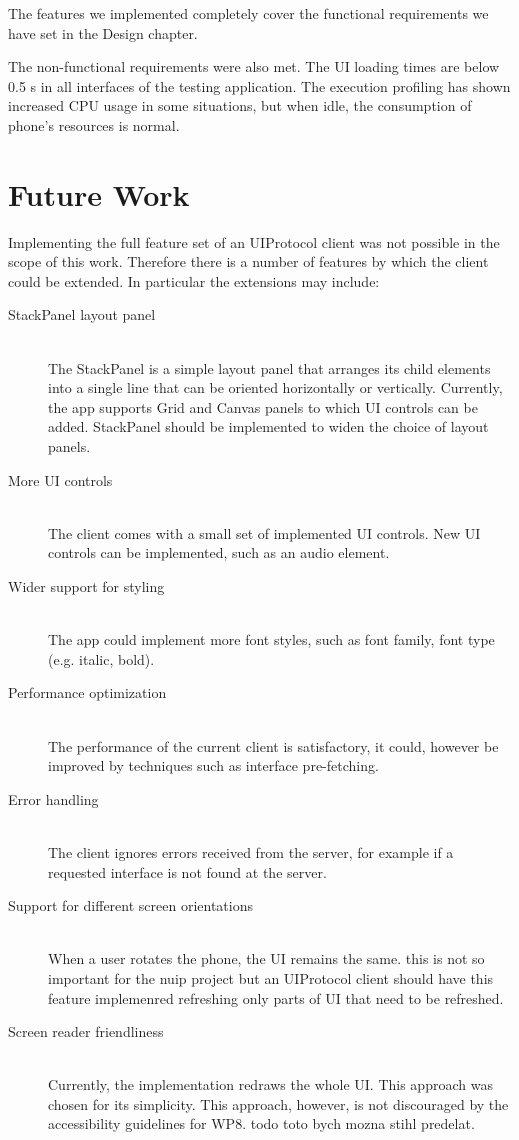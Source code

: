 The features we implemented completely cover the functional requirements we have set in the Design chapter.

The non-functional requirements were also met. The UI loading times are below 0.5 s in all interfaces of the testing application. The execution profiling has shown increased CPU usage in some situations, but when idle, the consumption of phone's resources is normal.

\section{Future Work}
Implementing the full feature set of an UIProtocol client was not possible in the scope of this work. Therefore there is a number of features by which the client could be extended. In particular the extensions may include:

\begin{description}
  \item[StackPanel layout panel] \hfill \\
  The StackPanel is a simple layout panel that arranges its child elements into a single line that can be oriented horizontally or vertically. Currently, the app supports Grid and Canvas panels to which UI controls can be added. StackPanel should be implemented to widen the choice of layout panels. 
  \item[More UI controls] \hfill \\
  The client comes with a small set of implemented UI controls. New UI controls can be implemented, such as an audio element.
  \item[Wider support for styling] \hfill \\
  The app could implement more font styles, such as font family, font type (e.g. italic, bold).
  \item[Performance optimization] \hfill \\
  The performance of the current client is satisfactory, it could, however be improved by techniques such as interface pre-fetching.
  \item[Error handling] \hfill \\
  The client ignores errors received from the server, for example if a requested interface is not found at the server.
  \item[Support for different screen orientations] \hfill \\
When a user rotates the phone, the UI remains the same. this is not so important for the nuip project but an UIProtocol client should have this feature implemenred
refreshing only parts of UI that need to be refreshed.
\item[Screen reader friendliness] \hfill \\
Currently, the implementation redraws the whole UI. This approach was chosen for its simplicity. This approach, however, is not discouraged by the accessibility guidelines for WP8. todo toto bych mozna stihl predelat.
\end{description}



